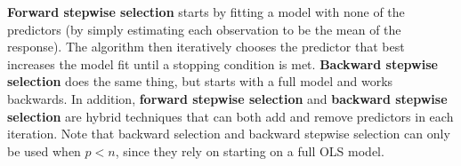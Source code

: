 \documentclass{article}
\begin{document}

	
	\textbf{Forward stepwise selection} starts by fitting a model with none of the predictors (by simply estimating each observation to be the mean of the response). The algorithm then iteratively chooses the predictor that best increases the model fit until a stopping condition is met. \textbf{Backward stepwise selection} does the same thing, but starts with a full model and works backwards. In addition, \textbf{forward stepwise selection} and \textbf{backward stepwise selection} are hybrid techniques that can both add and remove predictors in each iteration. Note that backward selection and backward stepwise selection can only be used when $p < n$, since they rely on starting on a full OLS model.
	
\end{document}
